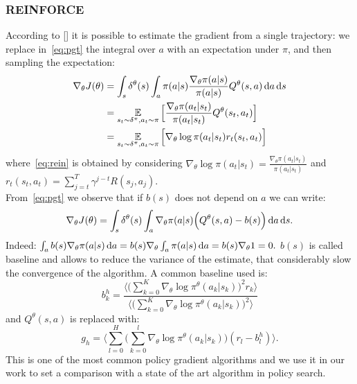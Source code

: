 \subsubsection{REINFORCE}
According to [\citet{Williams1992SimpleSG}] it is possible to estimate the gradient from a single trajectory: we replace in~\eqref{eq:pgt} the integral over $a$ with an expectation under $\pi$, and then sampling the expectation:
\begin{align}
\nabla_{\theta}J(\theta) &= \int_s \delta^{\theta}(s) \int_a \pi(a|s) \frac{\nabla_{\theta} \pi(a|s)}{\pi(a|s)} Q^{\theta}(s,a) \,\mathrm{d} a \,\mathrm{d} s \nonumber\\
&= \operatorname*{\mathbb{E}}_{s_t \sim \delta^{\pi}, a_t \sim \pi} \Big[ \frac{\nabla_{\theta} \pi(a_t|s_t)}{\pi(a_t|s_t)} Q^{\theta}(s_t,a_t) \Big] \nonumber\\
&= \operatorname*{\mathbb{E}}_{s_t \sim \delta^{\pi}, a_t \sim \pi} \Big[ \nabla_{\theta} \log\pi(a_t|s_t) r_t(s_t, a_t) \Big] \label{eq:rein}
\end{align}
where~\eqref{eq:rein} is obtained by considering $\nabla_{\theta} \log\pi(a_t|s_t) = \frac{\nabla_{\theta} \pi(a_t|s_t)}{\pi(a_t|s_t)}$ and $r_t(s_t, a_t) = \sum_{j = t}^T \gamma^{j-t} R(s_j, a_j)$.\\
\newline
From~\eqref{eq:pgt} we observe that if $b(s)$ does not depend on $a$ we can write:
$$ \nabla_{\theta}J(\theta) = \int_s \delta^{\theta}(s) \int_a \nabla_{\theta} \pi(a|s) \Big( Q^{\theta}(s,a) -b(s) \Big) \,\mathrm{d} a \,\mathrm{d} s. $$
Indeed: $\int_a b(s) \nabla_{\theta} \pi(a|s) \,\mathrm{d} a = b(s) \nabla_{\theta} \int_a \pi(a|s) \,\mathrm{d} a = b(s) \nabla_{\theta} 1 = 0.$
$b(s)$ is called baseline and allows to reduce the variance of the estimate, that considerably slow the convergence of the algorithm.
A common baseline used is:
$$ b_k^h = \frac{\Big\langle\Big( \sum_{k=0}^{K}\nabla_{\theta} \log\pi^{\theta}(a_k|s_k)\Big)^2r_k \Big\rangle}{\Big\langle\Big( \sum_{k=0}^{K}\nabla_{\theta} \log\pi^{\theta}(a_k|s_k)\Big)^2\Big \rangle}
$$
and $Q^{\theta}(s,a)$ is replaced with:
$$ g_h = \Big\langle \sum_{l=0}^{H} \Big( \sum_{k=0}^{l} \nabla_{\theta} \log \pi^{\theta}(a_k|s_k)\Big)(r_l - b_l^h)\Big\rangle.
$$
This is one of the most common policy gradient algorithms and we use it in our work to set a comparison with a state of the art algorithm in policy search.

